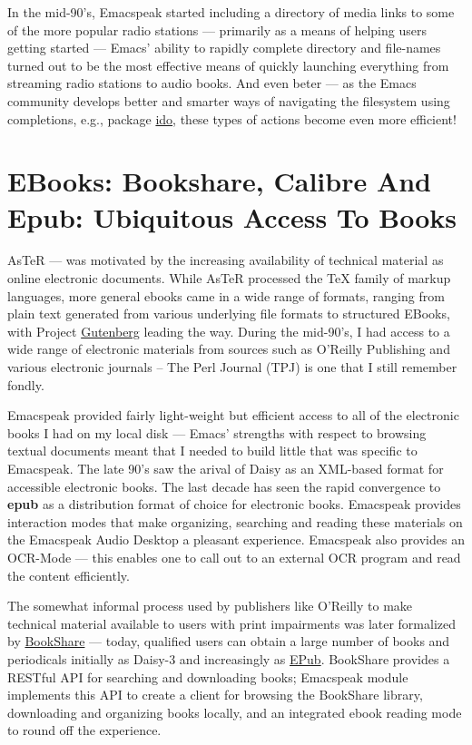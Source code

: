 \documentclass[11pt]{article}
\begin{document}
In the mid-90's, Emacspeak started including a directory of media
links to some of the more popular radio stations — primarily as a
means of helping users getting started — Emacs' ability to
rapidly complete directory and file-names turned out to be the
most effective means of quickly launching everything from
streaming radio stations to audio books. And even beter — as the
Emacs community develops better and smarter ways of navigating
the filesystem using completions, e.g., package \uline{ido}, these
types of actions become even more efficient!

\section{EBooks: Bookshare, Calibre And Epub: Ubiquitous Access To Books}
\label{sec-11}


AsTeR — was motivated by the increasing availability of technical
material as online electronic documents. While AsTeR processed
the \TeX{} family of markup languages, more general ebooks came in a
wide range of formats, ranging from plain text generated from
various underlying file formats to structured EBooks, with
Project \href{http://www.gutenberg.org/}{Gutenberg} leading the way. During the mid-90's, I had
access to a wide range of electronic materials from sources such
as O'Reilly Publishing and various electronic journals -- The
Perl Journal (TPJ) is one that I still remember fondly. 

Emacspeak provided fairly light-weight but efficient access to
all of the electronic books I had on my local disk — Emacs'
strengths with respect to browsing textual documents meant that I
needed to build little that was specific to Emacspeak. The late
90's saw the arival of Daisy as an XML-based format for
accessible electronic books. The last decade has seen the rapid
convergence to \textbf{epub} as a distribution format of choice for
electronic books. Emacspeak provides interaction modes that make
organizing, searching and reading these materials on the
Emacspeak Audio Desktop a pleasant experience. Emacspeak also
provides an OCR-Mode — this enables one to call out to an
external OCR program and read the content efficiently.

The somewhat informal process used by publishers like O'Reilly to
make technical material available to users with print impairments
was later formalized by \href{https://www.bookshare.org/#mainContent}{BookShare} — today, qualified users can
obtain a large number of books and periodicals initially as
Daisy-3 and increasingly as \uline{EPub}. BookShare provides a RESTful
API for searching and downloading books; Emacspeak module
$_{\text{ }}$implements this API to create a client for
browsing the BookShare library, downloading and organizing books
locally, and an integrated ebook  reading mode to round off the
experience.
\end{document}
